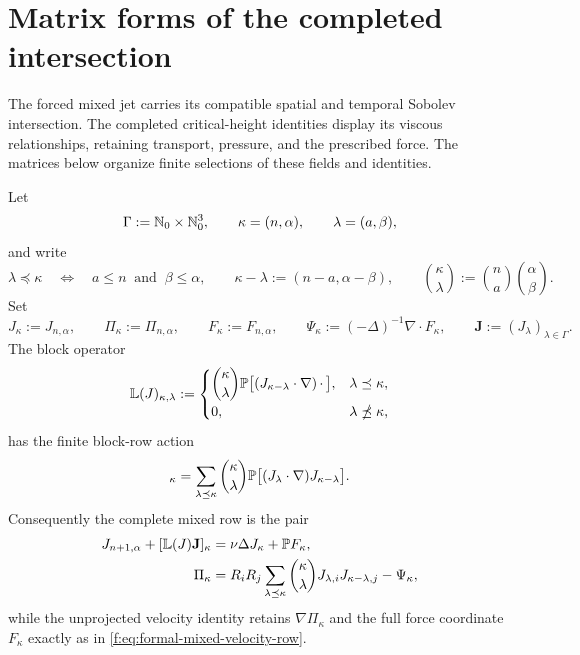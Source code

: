 \section{Matrix forms of the completed intersection}
\label{f:sec:matrix-forms}

The forced mixed jet carries its compatible spatial and temporal Sobolev
intersection. The completed critical-height identities display its viscous
relationships, retaining transport, pressure, and the prescribed force.
The matrices below organize finite selections of these fields and identities.

\begin{proposition}
\label{f:prop:formal-mixed-index-matrix}
Let
\[
 \Gamma:=\mathbb N_0\times\mathbb N_0^3,
 \qquad
 \kappa=(n,\alpha),
 \qquad
 \lambda=(a,\beta),
\]
and write
\[
 \lambda\preceq\kappa
 \quad\Longleftrightarrow\quad
 a\le n\ \text{ and }\ \beta\le\alpha,
 \qquad
 \kappa-\lambda:=(n-a,\alpha-\beta),
 \qquad
 \binom\kappa\lambda:=\binom na\binom\alpha\beta.
\]
Set
\[
 J_\kappa:=J_{n,\alpha},
 \qquad
 \Pi_\kappa:=\Pi_{n,\alpha},
 \qquad
 F_\kappa:=F_{n,\alpha},
 \qquad
 \Psi_\kappa:=(-\Delta)^{-1}\nabla\cdot F_\kappa,
 \qquad
 \mathbf J:=(J_\lambda)_{\lambda\in\Gamma}.
\]
The block operator
\begin{equation}
 \mathbb L(J)_{\kappa,\lambda}
 :=
 \begin{cases}
 \displaystyle
 \binom\kappa\lambda
 \mathbb P\bigl[(J_{\kappa-\lambda}\cdot\nabla)\,\mathord\cdot\,\bigr],
 &\lambda\preceq\kappa,\\[6pt]
 0,&\lambda\npreceq\kappa,
 \end{cases}
 \label{f:eq:formal-mixed-transport-matrix}
\end{equation}
has the finite block-row action
\begin{equation}
 [\mathbb L(J)\mathbf J]_\kappa
 =\sum_{\lambda\preceq\kappa}\binom\kappa\lambda
   \Pp\bigl[(J_\lambda\cdot\nabla)J_{\kappa-\lambda}\bigr].
 \label{f:eq:formal-mixed-transport-row}
\end{equation}
Consequently the complete mixed row is the pair
\begin{align}
 J_{n+1,\alpha}+[\mathbb L(J)\mathbf J]_\kappa
 &=\nu\Delta J_\kappa+\mathbb P F_\kappa,
 \label{f:eq:formal-mixed-projected-matrix-row}\\
 \Pi_\kappa
 &=R_iR_j\sum_{\lambda\preceq\kappa}\binom\kappa\lambda
   J_{\lambda,i}J_{\kappa-\lambda,j}-\Psi_\kappa,
 \label{f:eq:formal-mixed-matrix-pressure-row}
\end{align}
while the unprojected velocity identity retains
\(\nabla\Pi_\kappa\) and the full force coordinate \(F_\kappa\) exactly as in
\eqref{f:eq:formal-mixed-velocity-row}.


\end{proposition}
